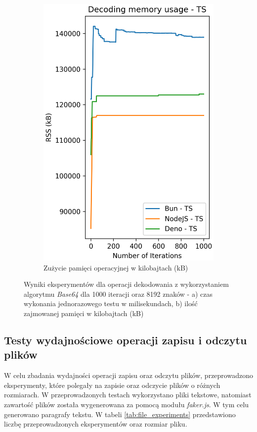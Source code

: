 \begin{figure}[H]
\begin{subfigure}[b]{0.4\textwidth}
    \includegraphics[width=\textwidth]{Figures/coding/base64_1000_decoding_ts_memory.png}
    \caption{Zużycie pamięci operacyjnej w kilobajtach (kB)}
    \label{fig:decoding_e2_ts_memory}
  \end{subfigure}
  \hfill
  \caption{Wyniki eksperymentów dla operacji dekodowania z wykorzystaniem algorytmu \textit{Base64} dla 1000 iteracji oraz 8192 znaków - a) czas wykonania jednorazowego testu w milisekundach, b) ilość zajmowanej pamięci w kilobajtach (kB)}
  \label{fig:decoding_e2_ts}
\end{figure}

\subsection{Testy wydajnościowe operacji zapisu i odczytu plików}
W celu zbadania wydajności operacji zapisu oraz odczytu plików, przeprowadzono eksperymenty, które polegały na zapisie oraz odczycie plików o różnych rozmiarach. W przeprowadzonych testach wykorzystano pliki tekstowe, natomiast zawartość plików została wygenerowana za pomocą modułu \textit{faker.js}. W tym celu generowano paragrafy tekstu. W tabeli \ref{tab:file_experiments} przedstawiono liczbę przeprowadzonych eksperymentów oraz rozmiar pliku.


